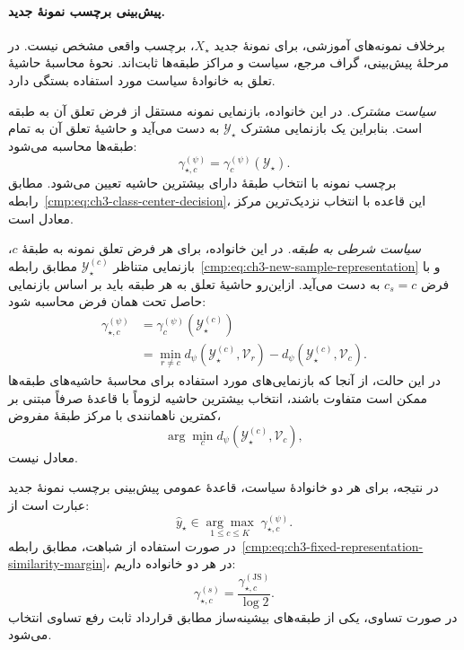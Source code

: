 \paragraph{پیش‌بینی برچسب نمونهٔ جدید.}
برخلاف نمونه‌های آموزشی، برای نمونهٔ جدید $X_\star$،
برچسب واقعی مشخص نیست. در مرحلهٔ پیش‌بینی، گراف
مرجع، سیاست و مراکز طبقه‌ها ثابت‌اند. نحوهٔ محاسبهٔ
حاشیهٔ تعلق به خانوادهٔ سیاست مورد استفاده بستگی دارد.

\emph{سیاست مشترک.}
در این خانواده، بازنمایی نمونه مستقل از فرض تعلق
آن به طبقه است. بنابراین یک بازنمایی مشترک
$\mathscr Y_\star$ به دست می‌آید و حاشیهٔ تعلق آن به
تمام طبقه‌ها محاسبه می‌شود:
\begin{equation}\label{cmp:eq:ch3-shared-inference-margin}
\gamma_{\star,c}^{(\psi)}
=\gamma_c^{(\psi)}(\mathscr Y_\star).
\end{equation}
برچسب نمونه با انتخاب طبقهٔ دارای بیشترین حاشیه تعیین
می‌شود. مطابق رابطه~\eqref{cmp:eq:ch3-class-center-decision}،
این قاعده با انتخاب نزدیک‌ترین مرکز معادل است.

\emph{سیاست شرطی به طبقه.}
در این خانواده، برای هر فرض تعلق نمونه به طبقهٔ $c$،
بازنمایی متناظر $\mathscr Y_\star^{(c)}$ مطابق
رابطه~\eqref{cmp:eq:ch3-new-sample-representation}
و با فرض $c_s=c$ به دست می‌آید. ازاین‌رو حاشیهٔ تعلق
به هر طبقه باید بر اساس بازنمایی حاصل تحت همان فرض
محاسبه شود:
\begin{equation}\label{cmp:eq:ch3-class-hypothesis-margin}
\begin{aligned}
\gamma_{\star,c}^{(\psi)}
&=\gamma_c^{(\psi)}(\mathscr Y_\star^{(c)})\\
&=\min_{r\ne c}d_\psi(\mathscr Y_\star^{(c)},\mathcal V_r)
-d_\psi(\mathscr Y_\star^{(c)},\mathcal V_c).
\end{aligned}
\end{equation}
در این حالت، از آنجا که بازنمایی‌های مورد استفاده
برای محاسبهٔ حاشیه‌های طبقه‌ها ممکن است متفاوت باشند،
انتخاب بیشترین حاشیه لزوماً با قاعدهٔ صرفاً مبتنی بر
کمترین ناهمانندی با مرکز طبقهٔ مفروض،
\begin{equation}\label{cmp:eq:ch3-class-hypothesis-self-distance}
\arg\min_c d_\psi(\mathscr Y_\star^{(c)},\mathcal V_c),
\end{equation}
معادل نیست.

در نتیجه، برای هر دو خانوادهٔ سیاست، قاعدهٔ عمومی
پیش‌بینی برچسب نمونهٔ جدید عبارت است از:
\begin{equation}\label{cmp:eq:ch3-class-hypothesis-inference}
\boxed{\widehat y_\star\in
\underset{1\le c\le K}{\arg\max}\;\gamma_{\star,c}^{(\psi)}.}
\end{equation}
در صورت استفاده از شباهت، مطابق
رابطه~\eqref{cmp:eq:ch3-fixed-representation-similarity-margin}،
در هر دو خانواده داریم:
\begin{equation}\label{cmp:eq:ch3-class-hypothesis-similarity-margin}
\gamma_{\star,c}^{(s)}
=\frac{\gamma_{\star,c}^{(\mathrm{JS})}}{\log2}.
\end{equation}
در صورت تساوی، یکی از طبقه‌های بیشینه‌ساز مطابق
قرارداد ثابت رفع تساوی انتخاب می‌شود.

